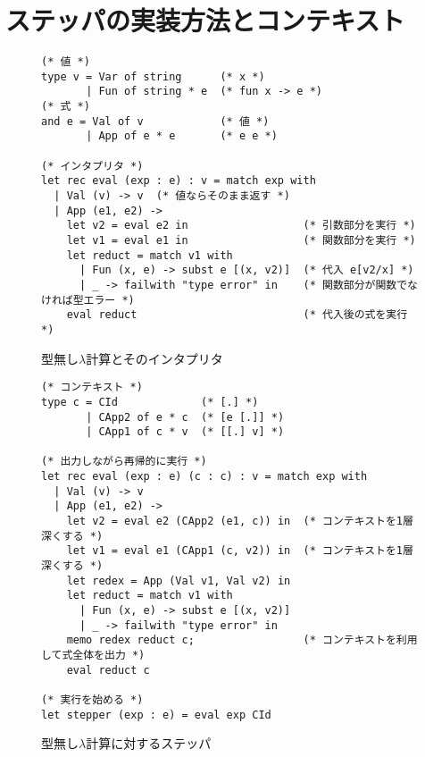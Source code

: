 \section{ステッパの実装方法とコンテキスト}
\label{section:context}

\begin{figure}
\begin{spacing}{0.9}
\begin{verbatim}
(* 値 *)
type v = Var of string      (* x *)
       | Fun of string * e  (* fun x -> e *)
(* 式 *)
and e = Val of v            (* 値 *)
       | App of e * e       (* e e *)

(* インタプリタ *)
let rec eval (exp : e) : v = match exp with
  | Val (v) -> v  (* 値ならそのまま返す *)
  | App (e1, e2) ->
    let v2 = eval e2 in                  (* 引数部分を実行 *)
    let v1 = eval e1 in                  (* 関数部分を実行 *)
    let reduct = match v1 with
      | Fun (x, e) -> subst e [(x, v2)]  (* 代入 e[v2/x] *)
      | _ -> failwith "type error" in    (* 関数部分が関数でなければ型エラー *)
    eval reduct                          (* 代入後の式を実行 *)
\end{verbatim}
\caption{型無し$\lambda$計算とそのインタプリタ}
\label{figure:lambda}
\end{spacing}
\end{figure}

\begin{figure}
\begin{spacing}{0.9}
\begin{verbatim}
(* コンテキスト *)
type c = CId             (* [.] *)
       | CApp2 of e * c  (* [e [.]] *)
       | CApp1 of c * v  (* [[.] v] *)

(* 出力しながら再帰的に実行 *)
let rec eval (exp : e) (c : c) : v = match exp with
  | Val (v) -> v
  | App (e1, e2) ->
    let v2 = eval e2 (CApp2 (e1, c)) in  (* コンテキストを1層深くする *)
    let v1 = eval e1 (CApp1 (c, v2)) in  (* コンテキストを1層深くする *)
    let redex = App (Val v1, Val v2) in
    let reduct = match v1 with
      | Fun (x, e) -> subst e [(x, v2)]
      | _ -> failwith "type error" in
    memo redex reduct c;                 (* コンテキストを利用して式全体を出力 *)
    eval reduct c

(* 実行を始める *)
let stepper (exp : e) = eval exp CId
\end{verbatim}
\caption{型無し$\lambda$計算に対するステッパ}
\label{figure:lambda_stepper}
\end{spacing}
\end{figure}

